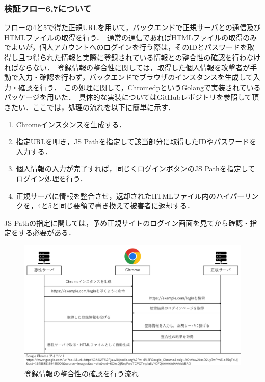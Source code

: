 \documentclass[dvipdfmx]{jsarticle}
\begin{document}
            \subsubsection{検証フロー6,7について}
                フローの4と5で得た正規URLを用いて，バックエンドで正規サーバとの通信及びHTMLファイルの取得を行う．\
                通常の通信であればHTMLファイルの取得のみでよいが，個人アカウントへのログインを行う際は，そのIDとパスワードを取得し且つ得られた情報と実際に登録されている情報との整合性の確認を行わなければならない．\
                登録情報の整合性に関しては，取得した個人情報を攻撃者が手動で入力・確認を行わず，バックエンドでブラウザのインスタンスを生成して入力・確認を行う．\
                この処理に関して，ChromedpというGolangで実装されているパッケージを用いた．\
                具体的な実装についてはGitHubレポジトリを参照して頂きたい．ここでは，処理の流れを以下に簡単に示す．\
                \begin{enumerate}
                    \item Chromeインスタンスを生成する．
                    \item 指定URLを叩き，JS Pathを指定して該当部分に取得したIDやパスワードを入力する．
                    \item 個人情報の入力が完了すれば，同じくログインボタンのJS Pathを指定してログイン処理を行う．
                    \item 正規サーバに情報を整合させ，返却されたHTMLファイル内のハイパーリンクを，4と5と同じ要領で書き換えて被害者に返却する．
                \end{enumerate}
                JS Pathの指定に関しては，予め正規サイトのログイン画面を見てから確認・指定をする必要がある．\
                \begin{figure}
                    \centering
                    \includegraphics[width=15cm]{img/vc-vf-6-7.png}
                    \caption{登録情報の整合性の確認を行う流れ}
                    \label{flow-6-7}
                \end{figure}
                \clearpage
\end{document}
